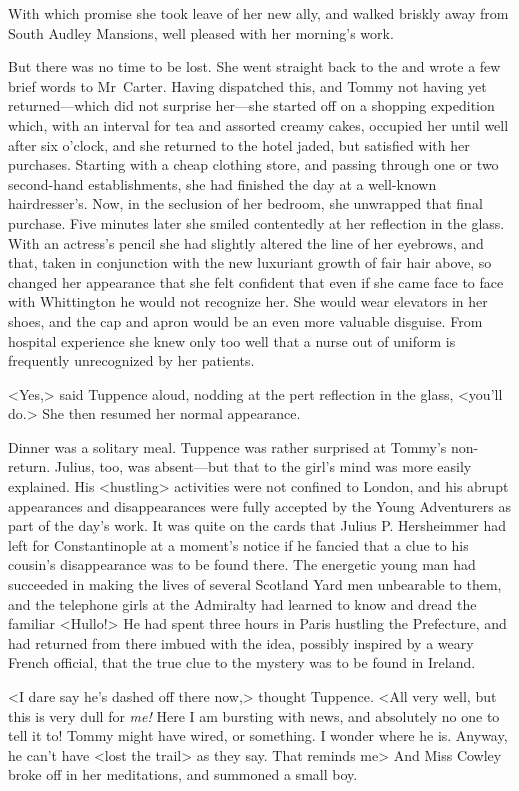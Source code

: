 With which promise she took leave of her new ally, and walked briskly away from South Audley Mansions, well pleased with her morning's work.

But there was no time to be lost. She went straight back to the  and wrote a few brief words to Mr~Carter. Having dispatched this, and Tommy not having yet returned—which did not surprise her—she started off on a shopping expedition which, with an interval for tea and assorted creamy cakes, occupied her until well after six o'clock, and she returned to the hotel jaded, but satisfied with her purchases. Starting with a cheap clothing store, and passing through one or two second-hand establishments, she had finished the day at a well-known hairdresser's. Now, in the seclusion of her bedroom, she unwrapped that final purchase. Five minutes later she smiled contentedly at her reflection in the glass. With an actress's pencil she had slightly altered the line of her eyebrows, and that, taken in conjunction with the new luxuriant growth of fair hair above, so changed her appearance that she felt confident that even if she came face to face with Whittington he would not recognize her. She would wear elevators in her shoes, and the cap and apron would be an even more valuable disguise. From hospital experience she knew only too well that a nurse out of uniform is frequently unrecognized by her patients.

<Yes,> said Tuppence aloud, nodding at the pert reflection in the glass, <you'll do.> She then resumed her normal appearance.

Dinner was a solitary meal. Tuppence was rather surprised at Tommy's non-return. Julius, too, was absent—but that to the girl's mind was more easily explained. His <hustling> activities were not confined to London, and his abrupt appearances and disappearances were fully accepted by the Young Adventurers as part of the day's work. It was quite on the cards that Julius P. Hersheimmer had left for Constantinople at a moment's notice if he fancied that a clue to his cousin's disappearance was to be found there. The energetic young man had succeeded in making the lives of several Scotland Yard men unbearable to them, and the telephone girls at the Admiralty had learned to know and dread the familiar <Hullo!> He had spent three hours in Paris hustling the Prefecture, and had returned from there imbued with the idea, possibly inspired by a weary French official, that the true clue to the mystery was to be found in Ireland.

<I dare say he's dashed off there now,> thought Tuppence. <All very well, but this is very dull for \emph{me!} Here I am bursting with news, and absolutely no one to tell it to! Tommy might have wired, or something. I wonder where he is. Anyway, he can't have <lost the trail> as they say. That reminds me\longdash> And Miss Cowley broke off in her meditations, and summoned a small boy.


